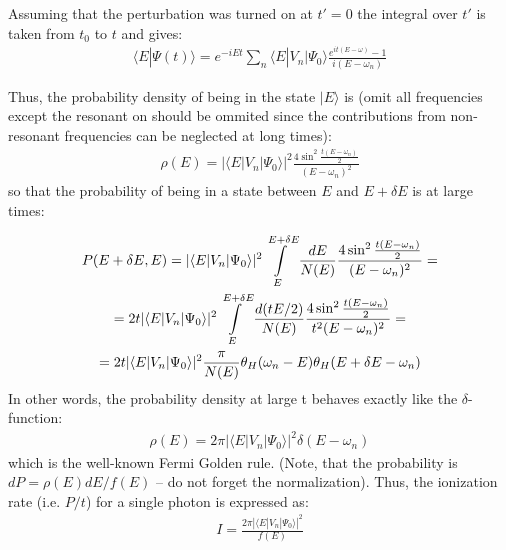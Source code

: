 Assuming that the perturbation was turned on at $ t'=0 $ the integral over $ t' $ is taken from $ t_{0} $ to $ t $ and gives:
\begin{gather}
	\langle E|\Psi(t)\rangle=e^{-iEt}\sum_{n}\langle E|V_{n}|\Psi_{0}\rangle\frac{e^{it(E-\omega)}-1}{i(E-\omega_{n})}
\end{gather}

Thus, the probability density of being in the state $ |E\rangle $ is (omit all frequencies except the resonant on should be ommited since the contributions from non-resonant frequencies can be neglected at long times):
\begin{gather}
	\rho(E)=|\langle E|V_{n}|\Psi_{0}\rangle|^{2}\frac{4\sin^{2}\frac{t(E-\omega_{n})}{2}}{(E-\omega_{n})^{2}}
\end{gather}
so that the probability of being in a state between $ E $ and $ E+\delta E $ is at large times:

\begin{multline}
	P(E+\delta E,E)=|\langle E|V_{n}|\Psi_{0}\rangle|^{2}\intop_{E}^{E+\delta E}\frac{dE}{N(E)}\frac{4\sin^{2}\frac{t(E-\omega_{n})}{2}}{(E-\omega_{n})^{2}}=\\=2t|\langle E|V_{n}|\Psi_{0}\rangle|^{2}\intop_{E}^{E+\delta E}\frac{d(tE/2)}{N(E)}\frac{4\sin^{2}\frac{t(E-\omega_{n})}{2}}{t^{2}(E-\omega_{n})^{2}}=\\=2t|\langle E|V_{n}|\Psi_{0}\rangle|^{2}\frac{\pi}{N(E)}\theta_{H}(\omega_{n}-E)\theta_{H}(E+\delta E-\omega_{n})
\end{multline}
In other words, the probability density at large t behaves exactly like the $ \delta $-function:
\begin{gather}
	\rho(E)=2\pi|\langle E|V_{n}|\Psi_{0}\rangle|^{2}\delta(E-\omega_{n})
\end{gather} 
which is the well-known Fermi Golden rule. (Note, that the probability is $ dP=\rho(E)dE/f(E) $ – do not forget the normalization). Thus, the ionization rate (i.e. $ P/t $) for a single photon is expressed as:
\begin{gather}
\label{golden_reul_first_order}
	I=\frac{2\pi|\langle E|V_{n}|\Psi_{0}\rangle|^{2}}{f(E)}
\end{gather}

